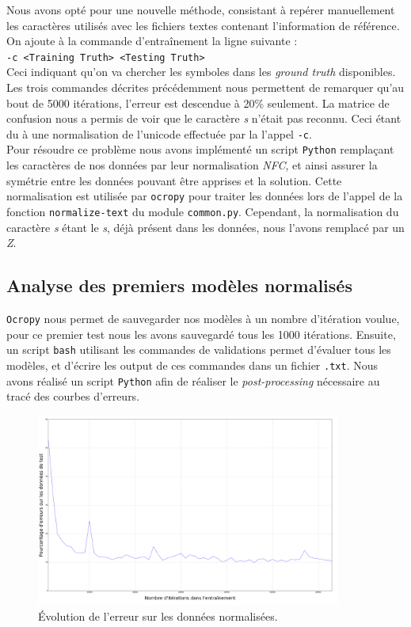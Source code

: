 \documentclass{article}
\newenvironment{oldstyle}{%
  \renewcommand\rmdefault{jkplvos}%
  \renewcommand\sfdefault{jkpssvos}%
  \renewcommand\ttdefault{jkpttvos}%
  \normalfont
}{}
\newcommand\s{\begin{oldstyle}s\end{oldstyle}}
\begin{document}
Nous avons opté pour une nouvelle méthode, consistant à repérer manuellement les caractères utilisés avec les fichiers textes contenant l'information de référence.
On ajoute à la commande d'entraînement la ligne suivante : \\
\texttt{-c <Training Truth> <Testing Truth>} \\
Ceci indiquant qu'on va chercher les symboles dans les \textit{ground truth} disponibles.
Les trois commandes décrites précédemment nous permettent de remarquer qu'au bout de 5000 itérations, l'erreur est descendue à 20\% seulement. La matrice de confusion nous a permis de voir que le caractère \textit{\s} n'était pas reconnu. Ceci étant du à une normalisation de l'unicode effectuée par la l'appel \texttt{-c}. \\
Pour résoudre ce problème nous avons implémenté un script \texttt{Python} remplaçant les caractères de nos données par leur normalisation \textit{NFC}, et ainsi assurer la symétrie entre les données pouvant être apprises et la solution. Cette normalisation est utilisée par \texttt{ocropy} pour traiter les données lors de l'appel de la fonction \texttt{normalize-text} du module \texttt{common.py}. Cependant, la normalisation du caractère \textit{\s} étant le \textit{s}, déjà présent dans les données, nous l'avons remplacé par un \textit{Z}.

\subsection{Analyse des premiers modèles normalisés}

\texttt{Ocropy} nous permet de sauvegarder nos modèles à un nombre d'itération voulue, pour ce premier test nous les avons sauvegardé tous les 1000 itérations. Ensuite, un script \texttt{bash} utilisant les commandes de validations permet d'évaluer tous les modèles, et d'écrire les output de ces commandes dans un fichier \texttt{.txt}. Nous avons réalisé un script \texttt{Python} afin de réaliser le \textit{post-processing} nécessaire au tracé des courbes d'erreurs.

\begin{figure}[!h] 
    \center
    \includegraphics[width=10cm]{Screenshots/error_normalized.png}
    \caption{Évolution de l'erreur sur les données normalisées.}
    \label{err_norm}
\end{figure}
\end{document}
